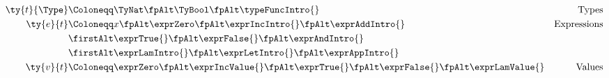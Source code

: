 \begin{align*}
  \ty{t}{\Type}
  &
    \Coloneqq
    \TyNat
    \fpAlt
    \TyBool
    \fpAlt
    \typeFuncIntro{}
  &
    \text{Types}
  \\
  \ty{e}{t}
  &
    \Coloneqq
    x
    \fpAlt
    \exprZero
    \fpAlt
    \exprIncIntro{}
    \fpAlt
    \exprAddIntro{}
  &
    \text{Expressions}
  \\
  &
    \firstAlt
    \exprTrue{}
    \fpAlt
    \exprFalse{}
    \fpAlt
    \exprAndIntro{}
  &
  \\
  &
    \firstAlt
    \exprLamIntro{}
    \fpAlt
    \exprLetIntro{}
    \fpAlt
    \exprAppIntro{}
  &
  \\
  \ty{v}{t}
  &
    \Coloneqq
    \exprZero
    \fpAlt
    \exprIncValue{}
    \fpAlt
    \exprTrue{}
    \fpAlt
    \exprFalse{}
    \fpAlt
    \exprLamValue{}
  &
    \text{Values}
\end{align*}

